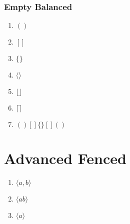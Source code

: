 \documentclass{article}
\begin{document}
\subsubsection{Empty Balanced}
\begin{enumerate}
  \item $()$
  \item $[]$
  \item $\{\}$
  \item $\langle\rangle$
  \item $\lfloor\rfloor$
  \item $\lceil\rceil$
  \item $()[]\{\}[]()$ %
\end{enumerate}

\section{Advanced Fenced}
\begin{enumerate}
  \item $\langle a,b \rangle $ %
  \item $\langle ab \rangle $ %
  \item $\langle a \rangle$ %
\end{enumerate}
\end{document}

